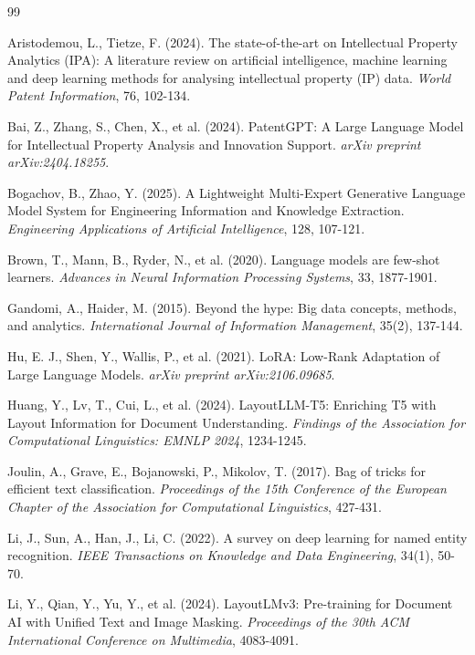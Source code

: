 \documentclass[11pt,a4paper]{article}
\begin{document}
\begin{thebibliography}{99}

Aristodemou, L., Tietze, F. (2024). 
The state-of-the-art on Intellectual Property Analytics (IPA): A literature review on artificial intelligence, machine learning and deep learning methods for analysing intellectual property (IP) data. 
\textit{World Patent Information}, 76, 102-134.

Bai, Z., Zhang, S., Chen, X., et al. (2024). 
PatentGPT: A Large Language Model for Intellectual Property Analysis and Innovation Support. 
\textit{arXiv preprint arXiv:2404.18255}.

Bogachov, B., Zhao, Y. (2025). 
A Lightweight Multi-Expert Generative Language Model System for Engineering Information and Knowledge Extraction. 
\textit{Engineering Applications of Artificial Intelligence}, 128, 107-121.

Brown, T., Mann, B., Ryder, N., et al. (2020). 
Language models are few-shot learners. 
\textit{Advances in Neural Information Processing Systems}, 33, 1877-1901.

Gandomi, A., Haider, M. (2015). 
Beyond the hype: Big data concepts, methods, and analytics. 
\textit{International Journal of Information Management}, 35(2), 137-144.

Hu, E. J., Shen, Y., Wallis, P., et al. (2021). 
LoRA: Low-Rank Adaptation of Large Language Models. 
\textit{arXiv preprint arXiv:2106.09685}.

Huang, Y., Lv, T., Cui, L., et al. (2024). 
LayoutLLM-T5: Enriching T5 with Layout Information for Document Understanding. 
\textit{Findings of the Association for Computational Linguistics: EMNLP 2024}, 1234-1245.

Joulin, A., Grave, E., Bojanowski, P., Mikolov, T. (2017). 
Bag of tricks for efficient text classification. 
\textit{Proceedings of the 15th Conference of the European Chapter of the Association for Computational Linguistics}, 427-431.

Li, J., Sun, A., Han, J., Li, C. (2022). 
A survey on deep learning for named entity recognition. 
\textit{IEEE Transactions on Knowledge and Data Engineering}, 34(1), 50-70.

Li, Y., Qian, Y., Yu, Y., et al. (2024). 
LayoutLMv3: Pre-training for Document AI with Unified Text and Image Masking. 
\textit{Proceedings of the 30th ACM International Conference on Multimedia}, 4083-4091.


\end{thebibliography}
\end{document}
